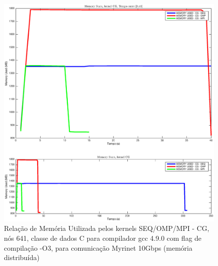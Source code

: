 \documentclass[conference,compsoc]{IEEEtran}
\begin{document}
\begin{figure}[H]
\centering
\includegraphics[width=1.1\columnwidth]{EPS/dstat_CG_seq_vs_omp_vs_mpi/memory.eps}
\caption{Relação de Memória Utilizada pelos kernels SEQ/OMP/MPI - CG, nós 641, classe de dados C para compilador gcc 4.9.0 com flag de compilação  -O3, para comunicação Myrinet 10Gbps (memória distribuída)}
\label{dstat_cg_SOM_mem}
\end{figure}
\end{document}
